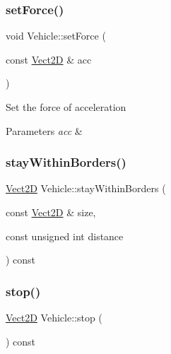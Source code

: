 \mbox{\label{classVehicle_a03e22c522e6f526f95428c81d0762833_a03e22c522e6f526f95428c81d0762833}} 
\subsubsection{\texorpdfstring{set\+Force()}{setForce()}}
{\footnotesize\ttfamily void Vehicle\+::set\+Force (\begin{DoxyParamCaption}\item[{const \hyperlink{classVect2D}{Vect2D} \&}]{acc }\end{DoxyParamCaption})}

Set the force of acceleration 
\begin{DoxyParams}{Parameters}
{\em acc} & \\
\hline
\end{DoxyParams}
\mbox{\label{classVehicle_a6149abf3e3f67df45d950562034d0fae_a6149abf3e3f67df45d950562034d0fae}} 
\subsubsection{\texorpdfstring{stay\+Within\+Borders()}{stayWithinBorders()}}
{\footnotesize\ttfamily \hyperlink{classVect2D}{Vect2D} Vehicle\+::stay\+Within\+Borders (\begin{DoxyParamCaption}\item[{const \hyperlink{classVect2D}{Vect2D} \&}]{size,  }\item[{const unsigned int}]{distance }\end{DoxyParamCaption}) const}

\mbox{\label{classVehicle_a9a1cb1e5dab4a474fbe0c1c49482d0ee_a9a1cb1e5dab4a474fbe0c1c49482d0ee}} 
\subsubsection{\texorpdfstring{stop()}{stop()}}
{\footnotesize\ttfamily \hyperlink{classVect2D}{Vect2D} Vehicle\+::stop (\begin{DoxyParamCaption}{ }\end{DoxyParamCaption}) const}

